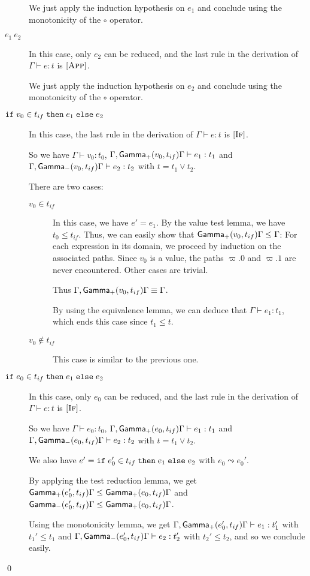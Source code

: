 \documentclass[a4paper]{article}
\theoremstyle{definition}
\begin{document}
\begin{description}
          We just apply the induction hypothesis on $e_1$ and conclude using the monotonicity of the $\circ$ operator.
          \item[$e_1\ e_2$] In this case, only $e_2$ can be reduced, and the last rule in the derivation of $\Gamma \vdash e:t$ is $[\textsc{App}]$.
    
          We just apply the induction hypothesis on $e_2$ and conclude using the monotonicity of the $\circ$ operator.
          \item[$\texttt{if}\;v_0\in t_{if}\;\texttt{then}\;e_1\;\texttt{else}\;e_2$] In this case, the last rule in the derivation of $\Gamma \vdash e:t$ is $[\textsc{If}]$.
           
          So we have $\Gamma \vdash v_0 : t_0$, $\Gamma, \textsf{Gamma}_{+}(v_0,t_{if}) \Gamma\vdash e_1 : t_1$ and $\Gamma, \textsf{Gamma}_{-}(v_0,t_{if}) \Gamma\vdash e_2 : t_2$ with $t=t_1\vee t_2$.
    
          There are two cases:
          \begin{description}
            \item[$v_0 \in t_{if}$] In this case, we have $e'=e_1$.
            By the value test lemma, we have $t_0 \leq t_{if}$.
            Thus, we can easily show that $\textsf{Gamma}_{+}(v_0,t_{if}) \Gamma \leq \Gamma$:
            For each expression in its domain, we proceed by induction on the associated paths.
            Since $v_0$ is a value, the paths $\varpi.0$ and $\varpi.1$ are never encountered. Other cases are trivial.
    
            Thus $\Gamma, \textsf{Gamma}_{+}(v_0,t_{if}) \Gamma \equiv \Gamma$.
    
            By using the equivalence lemma, we can deduce that $\Gamma \vdash e_1 : t_1$, which ends this case since $t_1 \leq t$.
            \item[$v_0 \not\in t_{if}$] This case is similar to the previous one.
          \end{description}
            
          \item[$\texttt{if}\;e_0\in t_{if}\;\texttt{then}\;e_1\;\texttt{else}\;e_2$] In this case, only $e_0$ can be reduced, and the last rule in the derivation of $\Gamma \vdash e:t$ is $[\textsc{If}]$.
          
          So we have $\Gamma \vdash e_0 : t_0$, $\Gamma, \textsf{Gamma}_{+}(e_0,t_{if}) \Gamma\vdash e_1 : t_1$ and $\Gamma, \textsf{Gamma}_{-}(e_0,t_{if}) \Gamma\vdash e_2 : t_2$ with $t=t_1\vee t_2$.
          
          We also have $e'=\texttt{if}\;e_0'\in t_{if}\;\texttt{then}\;e_1\;\texttt{else}\;e_2$ with $e_0\leadsto e_0'$.
    
          By applying the test reduction lemma, we get $\textsf{Gamma}_{+}(e_0',t_{if}) \Gamma \leq \textsf{Gamma}_{+}(e_0,t_{if}) \Gamma$ and
          $\textsf{Gamma}_{-}(e_0',t_{if}) \Gamma \leq \textsf{Gamma}_{+}(e_0,t_{if}) \Gamma$.
    
          Using the monotonicity lemma, we get $\Gamma, \textsf{Gamma}_{+}(e_0',t_{if}) \Gamma\vdash e_1 : t_1'$ with $t_1'\leq t_1$
          and $\Gamma, \textsf{Gamma}_{-}(e_0',t_{if}) \Gamma\vdash e_2 : t_2'$ with $t_2'\leq t_2$, and so we conclude easily.
        \end{description}
    
        \qed
\end{document}
